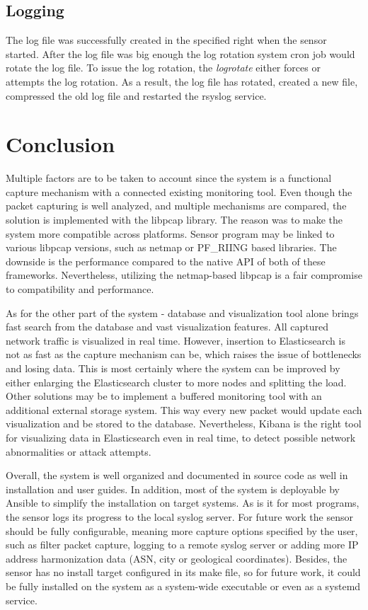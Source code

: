 \documentclass[12pt,a4paper,twoside]{book}
\begin{document}
    \section{Logging}
        The log file was successfully created in the specified right when the sensor started. After the log file was big enough the log rotation system cron job would rotate the log file. To issue the log rotation, the \emph{logrotate} either forces or attempts the log rotation. As a result, the log file has rotated, created a new file, compressed the old log file and restarted the rsyslog service.        
\chapter{Conclusion}
    Multiple factors are to be taken to account since the system is a functional capture mechanism with a connected existing monitoring tool. Even though the packet capturing is well analyzed, and multiple mechanisms are compared, the solution is implemented with the libpcap library. The reason was to make the system more compatible across platforms. Sensor program may be linked to various libpcap versions, such as netmap or PF\_RIING based libraries. The downside is the performance compared to the native API of both of these frameworks. Nevertheless, utilizing the netmap-based libpcap is a fair compromise to compatibility and performance.\par
    As for the other part of the system - database and visualization tool alone brings fast search from the database and vast visualization features. All captured network traffic is visualized in real time. However, insertion to Elasticsearch is not as fast as the capture mechanism can be, which raises the issue of bottlenecks and losing data. This is most certainly where the system can be improved by either enlarging the Elasticsearch cluster to more nodes and splitting the load. Other solutions may be to implement a buffered monitoring tool with an additional external storage system. This way every new packet would update each visualization and be stored to the database. Nevertheless, Kibana is the right tool for visualizing data in Elasticsearch even in real time, to detect possible network abnormalities or attack attempts.\par
    Overall, the system is well organized and documented in source code as well in installation and user guides. In addition, most of the system is deployable by Ansible to simplify the installation on target systems. As is it for most programs, the sensor logs its progress to the local syslog server. For future work the sensor should be fully configurable, meaning more capture options specified by the user, such as filter packet capture, logging to a remote syslog server or adding more IP address harmonization data (ASN, city or geological coordinates). Besides, the sensor has no install target configured in its make file, so for future work, it could be fully installed on the system as a system-wide executable or even as a systemd service.\par
\end{document}
